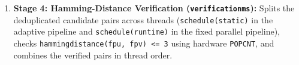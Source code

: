 \documentclass[11pt,a4paper]{article}
\renewcommand{\_}{\textunderscore\allowbreak}
\begin{document}
\begin{enumerate}
\begin{itemize}
        $$\text{has\_zero\_byte}(x) = (x - \text{0x0101010101010101}) \ \& \ \sim x \ \& \ \text{0x8080808080808080}$$
        If an earlier byte is zero, the pair already matched in an earlier band $b' < b$ and is skipped right away, while counters track \texttt{raw\_candidates\_evaluated}, \texttt{raw\_candidates\_emitted}, and \texttt{suppressed\_pair\_count}.
    \end{itemize}
    \item \textbf{Stage 4: Hamming-Distance Verification (\texttt{verification\_ms}):} Splits the deduplicated candidate pairs across threads (\texttt{schedule(static)} in the adaptive pipeline and \texttt{schedule(runtime)} in the fixed parallel pipeline), checks \texttt{hamming\_distance(fp\_u, fp\_v) <= 3} using hardware \texttt{POPCNT}, and combines the verified pairs in thread order.
\end{enumerate}
\end{document}
